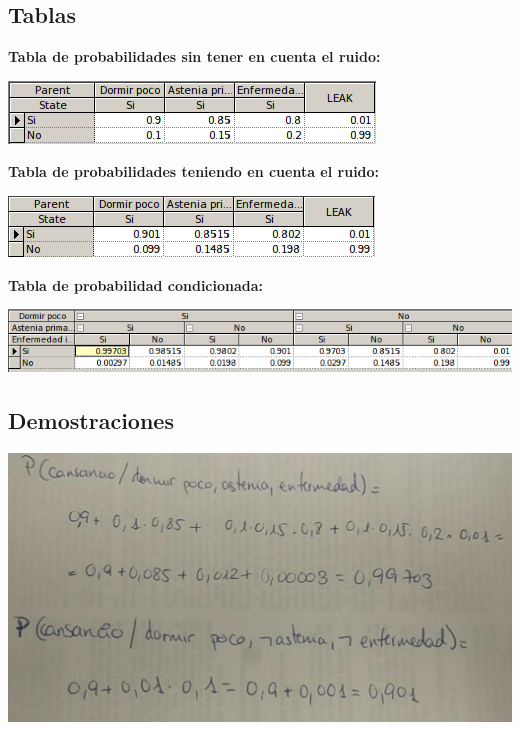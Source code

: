 \documentclass{article}
\begin{document}
\subsection{\textbf{Tablas}}

\textbf{Tabla de probabilidades sin tener en cuenta el ruido:}

\begin{center}
\includegraphics[scale=0.5]{tabla1.png}
\end{center}

\textbf{Tabla de probabilidades teniendo en cuenta el ruido:}

\begin{center}
\includegraphics[scale=0.5]{tabla2.png}
\end{center}

\textbf{Tabla de probabilidad condicionada:}

\begin{center}
\includegraphics[scale=0.5]{tabla3.png}
\end{center}

\subsection{\textbf{Demostraciones}}

\begin{center}
\includegraphics[scale=0.4]{demostraciones.jpg}
\end{center}
\end{document}
